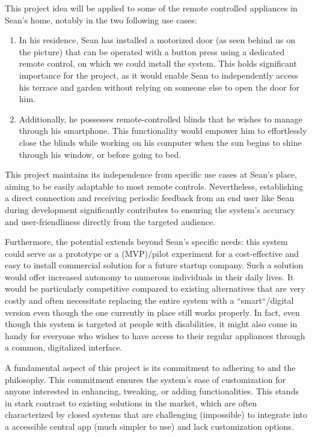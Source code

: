 This project idea will be applied to some of the remote controlled appliances in Sean's home, notably in the two following use cases:
\begin{enumerate}
    \item In his residence, Sean has installed a motorized door (as seen behind us on the picture) that can be operated with a button press using a dedicated remote control, on which we could install the system.
        This holds significant importance for the project, as it would enable Sean to independently access his terrace and garden without relying on someone else to open the door for him.
    \item Additionally, he possesses remote-controlled blinds that he wishes to manage through his smartphone.
        This functionality would empower him to effortlessly close the blinds while working on his computer when the sun begins to shine through his window, or before going to bed.
\end{enumerate}

This project maintains its independence from specific use cases at Sean's place, aiming to be easily adaptable to most remote controls.
Nevertheless, establishing a direct connection and receiving periodic feedback from an end user like Sean during development significantly contributes to ensuring the system's accuracy and user-friendliness directly from the targeted audience.

Furthermore, the potential extends beyond Sean's specific needs: this system could serve as a prototype or a  (MVP)/pilot experiment for a cost-effective and easy to install commercial solution for a future startup company.
Such a solution would offer increased autonomy to numerous individuals in their daily lives.
It would be particularly competitive compared to existing alternatives that are very costly and often necessitate replacing the entire system with a ``smart``/digital version even though the one currently in place still works properly.
In fact, even though this system is targeted at people with disabilities, it might also come in handy for everyone who wishes to have access to their regular appliances through a common, digitalized interface.

A fundamental aspect of this project is its commitment to adhering to  and the  philosophy.
This commitment ensures the system's ease of customization for anyone interested in enhancing, tweaking, or adding functionalities.
This stands in stark contrast to existing solutions in the market, which are often characterized by closed systems that are challenging (impossible) to integrate into a accessible central app (much simpler to use) and lack customization options.

